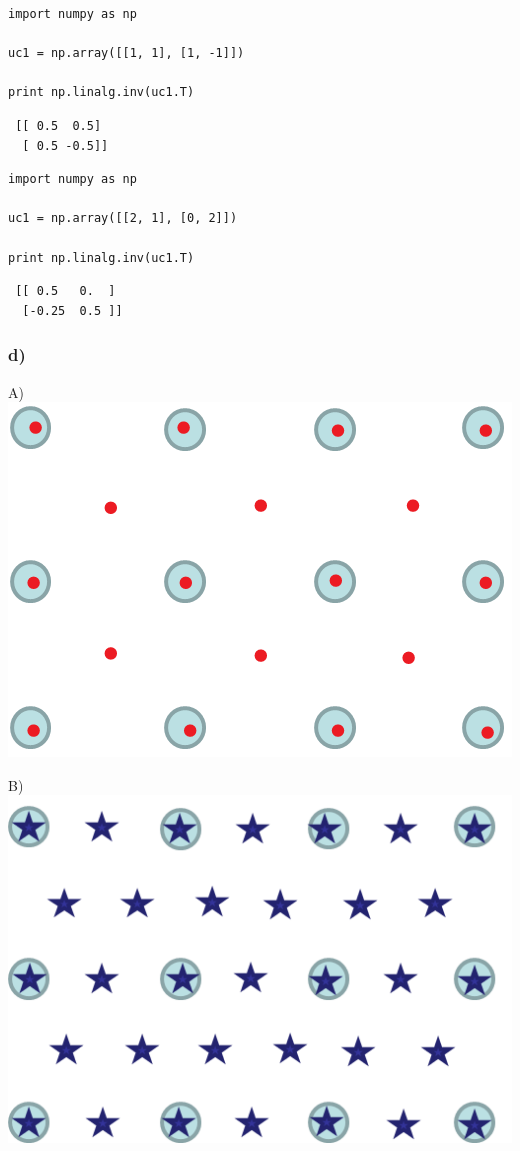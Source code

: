 \documentclass{article}
\begin{document}
\begin{verbatim}
import numpy as np

uc1 = np.array([[1, 1], [1, -1]])

print np.linalg.inv(uc1.T)
\end{verbatim}

\begin{verbatim}
 [[ 0.5  0.5]
  [ 0.5 -0.5]]
\end{verbatim}


\begin{verbatim}
import numpy as np

uc1 = np.array([[2, 1], [0, 2]])

print np.linalg.inv(uc1.T)
\end{verbatim}

\begin{verbatim}
 [[ 0.5   0.  ]
  [-0.25  0.5 ]]
\end{verbatim}
\subsubsection{d)}
\label{sec-2-1-4}


A)
\includegraphics[width=.9\linewidth]{./images/leed-image-1.png}

B)
\includegraphics[width=.9\linewidth]{./images/leed-image-2.png}
\end{document}
